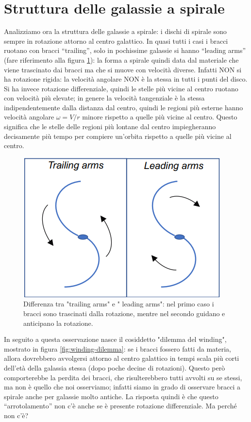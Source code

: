 \section{Struttura delle galassie a spirale}\label{sec:struttura-delle-galassie-a-spirale}
Analizziamo ora la struttura delle galassie a spirale: i dischi di spirale sono sempre in rotazione attorno al centro galattico. In quasi tutti i casi i bracci ruotano con bracci “trailing”, solo in pochissime galassie si hanno “leading arms” (fare riferimento alla figura \ref{fig:trailing-leading arms}): la forma a spirale quindi data dal materiale che viene trascinato dai bracci ma che si muove con velocità diverse. Infatti NON si ha rotazione rigida: la velocità angolare NON è la stessa in tutti i punti del disco. Si ha invece rotazione differenziale, quindi le stelle più vicine al centro ruotano con velocità più elevate; in genere la velocità tangenziale è la stessa indipendentemente dalla distanza dal centro, quindi le regioni più esterne hanno velocità angolare $\omega = V/r$ minore rispetto a quelle più vicine al centro. Questo significa che le stelle delle regioni più lontane dal centro impiegheranno decisamente più tempo per compiere un'orbita rispetto a quelle più vicine al centro.

\begin{figure}
    \centering
    \includegraphics{immagini/trailing-leading-arms.png}
    \caption[width = 0.5 \textwidth]{Differenza tra "trailing arms" e " leading arms": nel primo caso i bracci sono trascinati dalla rotazione, mentre nel secondo guidano e anticipano la rotazione.}
    \label{fig:trailing-leading arms}
\end{figure}

In seguito a questa osservazione nasce il cosiddetto "dilemma del winding", mostrato in figura \ref{fig:winding-dilemma}: se i bracci fossero fatti da materia, allora dovrebbero avvolgersi attorno al centro galattico in tempi scala più corti dell’età della galassia stessa (dopo poche decine di rotazioni). Questo però comporterebbe la perdita dei bracci, che risulterebbero tutti avvolti su se stessi, ma non è quello che noi osserviamo; infatti siamo in grado di osservare bracci a spirale anche per galassie molto antiche. La risposta quindi è che questo “arrotolamento” non c’è anche se è presente rotazione differenziale. Ma perché non c'è?

